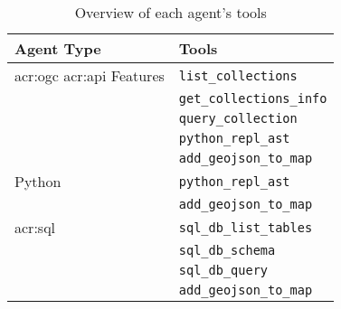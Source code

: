 \begin{table}[h]
    \centering
    \caption{Overview of each agent's tools}
    \label{tbl:agent-tool-overview}
    \begin{tabularx}{0.7\textwidth}{XX}
        \toprule
        \textbf{Agent Type}                            & \textbf{Tools}                  \\
        \midrule
        \acrshort{acr:ogc} \acrshort{acr:api} Features & \texttt{list\_collections}      \\
                                                       & \texttt{get\_collections\_info} \\
                                                       & \texttt{query\_collection}      \\
                                                       & \texttt{python\_repl\_ast}      \\
                                                       & \texttt{add\_geojson\_to\_map}  \\
        \midrule
        Python                                         & \texttt{python\_repl\_ast}      \\
                                                       & \texttt{add\_geojson\_to\_map}  \\
        \midrule
        \acrshort{acr:sql}                             & \texttt{sql\_db\_list\_tables}  \\
                                                       & \texttt{sql\_db\_schema}        \\
                                                       & \texttt{sql\_db\_query}         \\
                                                       & \texttt{add\_geojson\_to\_map}  \\
        \bottomrule
    \end{tabularx}
\end{table}

